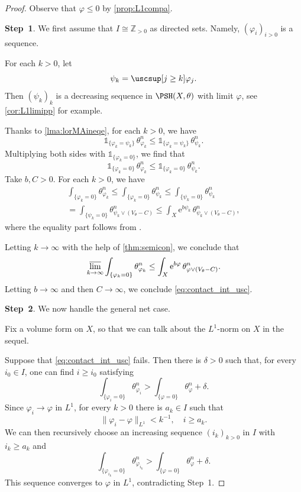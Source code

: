 \begin{proof}
    Observe that $\varphi\leq 0$ by \cref{prop:L1compa}.

    \textbf{Step~1}. We first assume that $I\cong \mathbb{Z}_{>0}$ as directed sets. Namely, $(\varphi_i)_{i>0}$ is a sequence.

    For each $k>0$, let
    \[
    \psi_k=\uscsup[j\geq k] \varphi_j.
    \]
    Then $(\psi_k)_{k}$ is a decreasing sequence in $\PSH(X,\theta)$ with limit $\varphi$, see \cref{cor:L1limipp} for example.

    Thanks to \cref{lma:lorMAineqe}, for each $k>0$, we have
    \[
    \mathds{1}_{\{\varphi_k=\psi_k\}}\,\theta_{\varphi_k}^n\leq \mathds{1}_{\{\varphi_k=\psi_k\}}\,\theta_{\psi_k}^n.
    \]
    Multiplying both sides with $\mathds{1}_{\{\varphi_k=0\}}$, we find that
    \[
    \mathds{1}_{\{\varphi_k=0\}}\,\theta_{\varphi_k}^n\leq \mathds{1}_{\{\varphi_k=0\}}\,\theta_{\psi_k}^n.
    \]
    Take $b,C>0$. For each $k>0$, we have
    \[
    \begin{split}
    \int_{\{\varphi_k=0\}} \theta_{\varphi_k}^n\leq \int_{\{\varphi_k=0\}} \theta_{\psi_k}^n\leq \int_{\{\psi_k=0\}} \theta_{\psi_k}^n\\=\int_{\{\psi_k=0\}} \theta_{\psi_k\lor (V_{\theta}-C)}^n\leq \int_X \mathrm{e}^{b\psi_k}\,\theta_{\psi_k\lor (V_{\theta}-C)}^n,
    \end{split}
    \]
    where the equality part follows from .

    Letting $k\to\infty$ with the help of \cref{thm:semicon}, we conclude that
    \[
    \varlimsup_{k\to\infty}\int_{\{\varphi_k=0\}} \theta_{\varphi_k}^n\leq \int_X \mathrm{e}^{b\varphi}\,\theta_{\varphi\lor (V_{\theta}-C)}^n.
    \]
    Letting $b\to\infty$ and then $C\to\infty$, we conclude \eqref{eq:contact_int_usc}.

    \textbf{Step~2}. We now handle the general net case.

    Fix a volume form on $X$, so that we can talk about the $L^1$-norm on $X$ in the sequel.

    Suppose that \eqref{eq:contact_int_usc} fails. Then there is $\delta>0$ such that, for every $i_0\in I$, one can find $i\geq i_0$ satisfying
    \[
        \int_{\{\varphi_i=0\}}\theta_{\varphi_i}^n>\int_{\{\varphi=0\}}\theta_{\varphi}^n+\delta.
    \]
    Since $\varphi_i\to\varphi$ in $L^1$, for every $k>0$ there is $a_k\in I$ such that
    \[
        \|\varphi_i-\varphi\|_{L^1}<k^{-1},\quad i\geq a_k.
    \]
    We can then recursively choose an increasing sequence $(i_k)_{k>0}$ in $I$ with $i_k\geq a_k$ and
    \[
        \int_{\{\varphi_{i_k}=0\}}\theta_{\varphi_{i_k}}^n>\int_{\{\varphi=0\}}\theta_{\varphi}^n+\delta.
    \]
    This sequence converges to $\varphi$ in $L^1$, contradicting Step~1.
\end{proof}

